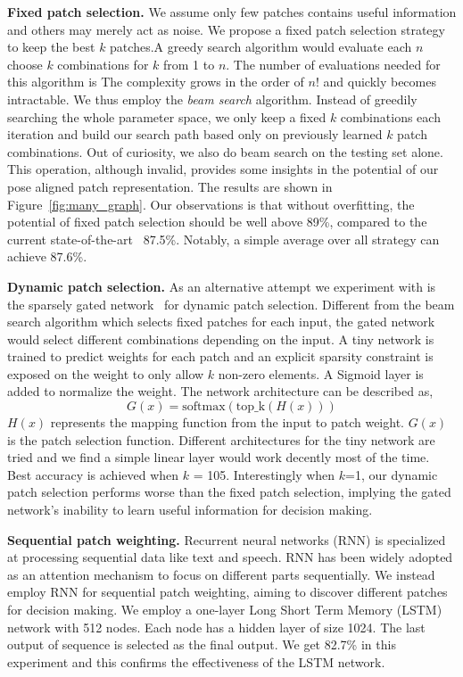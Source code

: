 \noindent\textbf{Fixed patch selection.}
We assume only few patches contains useful information and others may merely act as noise.
We propose a fixed patch selection strategy to keep the best $k$ patches.A greedy search algorithm would evaluate each $n$ choose $k$  combinations for $k$  from 1 to $n$. 
The number of evaluations needed for this algorithm is 
The complexity grows in the order of $n!$ and quickly becomes intractable. 
We thus employ the \emph{beam search} algorithm.
Instead of greedily searching the whole parameter space, we only keep a fixed $k$ combinations each iteration and build our search path based only on previously learned $k$ patch combinations. 
Out of curiosity,
we also do beam search on the testing set alone. 
This operation, although invalid, provides some insights in the potential of our pose aligned patch representation. 
The results are shown in Figure~\ref{fig:many_graph}.
Our observations is that without overfitting, the potential of fixed patch selection should be well above 89\%, compared to the current state-of-the-art~\cite{LamMT_CVPR2017} 87.5\%. Notably, a simple average over all strategy can achieve 87.6\%.


\noindent\textbf{Dynamic patch selection.} As an alternative attempt 
we experiment with is the sparsely gated network~\cite{ShazeerMMDLHD_ArXiv2017} for dynamic patch selection. 
Different from the beam search algorithm which selects fixed patches for each input,
the gated network would select different combinations depending on the input.
A tiny network is trained to predict weights for each patch and an explicit sparsity constraint is exposed on the weight to only allow $k$ non-zero elements. 
A Sigmoid layer is added to normalize the weight.
The network architecture can be described as,
$$G(x)=\text{softmax}(\text{top\_k}(H(x)))$$
$H(x)$ represents the mapping function from the input to patch weight. $G(x)$ is the patch selection function.
Different architectures for the tiny network are tried and we find a simple linear layer would work decently most of the time.
Best accuracy is achieved when $k$ = 105. 
Interestingly when $k$=1, our dynamic patch selection performs worse than the fixed patch selection, implying the gated network's inability to learn useful information for decision making.

\noindent\textbf{Sequential patch weighting.} Recurrent neural networks (RNN) is specialized at processing sequential data like text and speech.
 RNN has been widely adopted as an attention mechanism to focus on different parts sequentially. We instead employ RNN for sequential patch weighting, aiming to discover different patches for decision making.
We employ a one-layer Long Short Term Memory (LSTM) network with 512 nodes. Each node has a hidden layer of size 1024. 
The last output of sequence is selected as the final output.
We get 82.7\% in this experiment and this confirms the effectiveness of the LSTM network.

